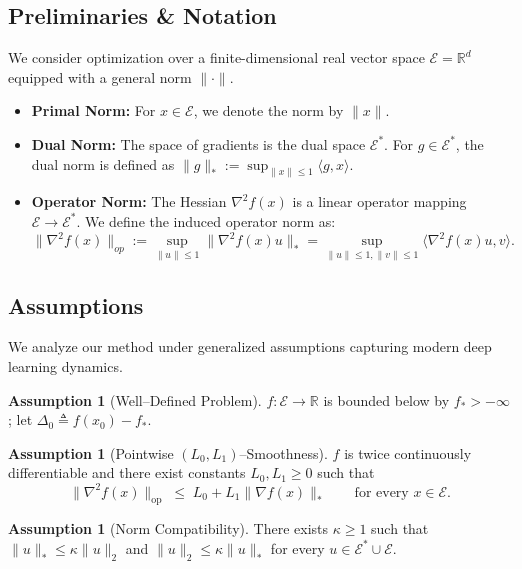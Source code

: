 \documentclass{article}
\theoremstyle{plain}
\theoremstyle{definition}
\newtheorem{assumption}[theorem]{Assumption}
\theoremstyle{remark}
\newcommand{\R}{\mathbb{R}}
\begin{document}
\subsection{Preliminaries \& Notation}

We consider optimization over a finite-dimensional real vector space $\mathcal{E} = \R^d$ equipped with a general norm $\|\cdot\|$.
\begin{itemize}
    \item \textbf{Primal Norm:} For $x \in \mathcal{E}$, we denote the norm by $\|x\|$.
    \item \textbf{Dual Norm:} The space of gradients is the dual space $\mathcal{E}^*$. For $g \in \mathcal{E}^*$, the dual norm is defined as $\|g\|_* := \sup_{\|x\| \le 1} \langle g, x \rangle$.
    \item \textbf{Operator Norm:} The Hessian $\nabla^2 f(x)$ is a linear operator mapping $\mathcal{E} \to \mathcal{E}^*$. We define the induced operator norm as:
    \begin{equation*}
        \|\nabla^2 f(x)\|_{op} := \sup_{\|u\| \le 1} \|\nabla^2 f(x) u\|_* = \sup_{\|u\| \le 1, \|v\| \le 1} \langle \nabla^2 f(x) u, v \rangle.
    \end{equation*}
\end{itemize}

\subsection{Assumptions}

We analyze our method under generalized assumptions capturing modern deep learning dynamics.

\begin{assumption}[Well--Defined Problem]
\label{ass:well_defined}
$f : \mathcal{E} \to \mathbb{R}$ is bounded below by $f_* > -\infty$; let
$\Delta_0 \triangleq f(x_0) - f_*$.
\end{assumption}

\begin{assumption}[Pointwise $(L_0, L_1)$--Smoothness]
\label{ass:geometric_smoothness}
$f$ is twice continuously differentiable and there exist constants
$L_0, L_1 \geq 0$ such that
\begin{equation}
  \|\nabla^2 f(x)\|_{\mathrm{op}}
  \;\leq\; L_0 + L_1 \|\nabla f(x)\|_*
  \qquad \text{for every } x \in \mathcal{E}.
\end{equation}
\end{assumption}

\begin{assumption}[Norm Compatibility]
\label{ass:norm_compatibility}
There exists $\kappa \geq 1$ such that $\|u\|_* \leq \kappa \|u\|_2$ and
$\|u\|_2 \leq \kappa \|u\|_*$ for every $u \in \mathcal{E}^* \cup
\mathcal{E}$.
\end{assumption}
\end{document}
